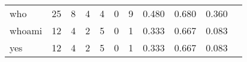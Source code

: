\begin{longtable}{lp{1.2cm}p{1.2cm}p{1.2cm}p{1.2cm}p{1.2cm}p{1.2cm}p{1.2cm}p{1.2cm}p{1.2cm}p{1.2cm}}
who       &                                    25 &                                                  8 &                                                  4 &                                                  4 &                                                  0 &                                                  9 &                                         0.480 &                                              0.680 &                                              0.360 \\
whoami    &                                    12 &                                                  4 &                                                  2 &                                                  5 &                                                  0 &                                                  1 &                                         0.333 &                                              0.667 &                                              0.083 \\
yes       &                                    12 &                                                  4 &                                                  2 &                                                  5 &                                                  0 &                                                  1 &                                         0.333 &                                              0.667 &                                              0.083 \\
\end{longtable}
